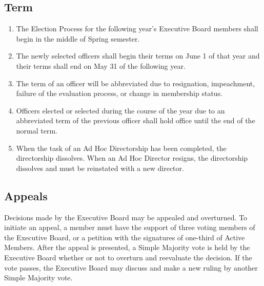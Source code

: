 \documentclass{article}
\newcommand{\asection}[1]{\subsection{#1} \label{#1}}
\begin{document}
\asection{Term}
\begin{enumerate}
\item The Election Process for the following year's Executive Board members shall begin in the middle of Spring semester.
\item The newly selected officers shall begin their terms on June 1 of that year and their terms shall end on May 31 of the following year.
\item The term of an officer will be abbreviated due to resignation, impeachment, failure of the evaluation process, or change in membership status.
\item Officers elected or selected during the course of the year due to an abbreviated term of the previous officer shall hold office until the end of the normal term.
\item When the task of an Ad Hoc Directorship has been completed, the directorship dissolves. When an Ad Hoc Director resigns, the directorship dissolves and must be reinstated with a new director.
\end{enumerate}

\asection{Appeals}
Decisions made by the Executive Board may be appealed and overturned. To initiate an appeal, a member must have the support of three voting members of the Executive Board, or a petition with the signatures of one-third of Active Members. After the appeal is presented, a Simple Majority vote is held by the Executive Board whether or not to overturn and reevaluate the decision. If the vote passes, the Executive Board may discuss and make a new ruling by another Simple Majority vote.
\end{document}
